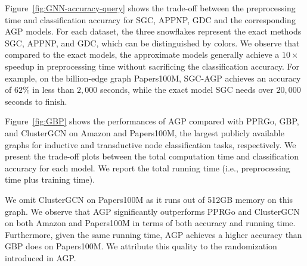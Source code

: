  Figure~\ref{fig:GNN-accuracy-query} shows the trade-off between the preprocessing time and classification accuracy for SGC, APPNP, GDC and the corresponding AGP models. For each dataset, the three snowflakes represent the exact methods SGC, APPNP, and GDC, which can be distinguished by colors.
We observe that compared to the exact models, the approximate models generally achieve a $10\times$ speedup in preprocessing time without sacrificing the classification accuracy. For example, on the billion-edge graph Papers100M,  SGC-AGP achieves an accuracy of $62\%$ in less than $2,000$ seconds, while the exact model SGC needs over $20,000$ seconds to finish. %

Figure~\ref{fig:GBP} shows the performances of AGP compared with PPRGo, GBP, and ClusterGCN on Amazon and Papers100M, the largest publicly available graphs for inductive and transductive node classification tasks, respectively.
We present the trade-off plots between the total computation time and classification accuracy for each model. We report the total running time (i.e., preprocessing time plus training time). 

We omit ClusterGCN on Papers100M as it runs out of 512GB memory on this graph. We observe that AGP significantly outperforms PPRGo and ClusterGCN on both Amazon and Papers100M in terms of both accuracy and running time. Furthermore, given the same running time, AGP achieves a higher accuracy than GBP does on Papers100M. We attribute this quality to the randomization introduced in AGP.











